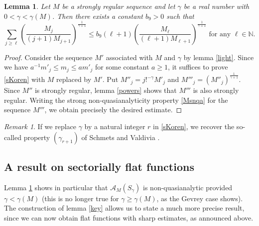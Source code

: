 \documentclass[a4paper]{amsart}
\theoremstyle{plain}
\newtheorem{lem}[subsubsection]{Lemma}
\theoremstyle{definition}
\theoremstyle{remark}
\newtheorem{rem}[subsubsection]{Remark}
\begin{document}
\begin{lem}\label{classqa}
Let $ M $ be a strongly regular sequence and let $ \gamma $ be a real number with
$ 0<\gamma<\gamma(M) $. Then there exists a constant $ b_9>0 $ such that 
\begin{equation}\label{sKoren}
\sum_{j\geq\ell}\left(\frac{M_j}{(j+1)M_{j+1}}\right)^{\frac{1}{\gamma+1}}\leq
b_9(\ell+1)\left(\frac{M_\ell}{(\ell+1)M_{\ell+1}}\right)^{\frac{1}{\gamma+1}}
\text{ for any }\ell\in\mathbb{N}.
\end{equation} 
\end{lem}
\begin{proof}
Consider the sequence $ M' $ associated with $ M $ and $ \gamma $ by lemma \ref{light}. Since we have $ a^{-1}m'_j\leq m_j\leq am'_j $ for some constant $ a\geq 1 $, it suffices to prove \eqref{sKoren} with $ M $ replaced by $ M' $. Put $ M''_j=j!^{-\gamma}M'_j $ and
$ M'''_j=(M''_j)^{\frac{1}{\gamma+1}} $. Since $ M'' $ is strongly regular, lemma \ref{powers} shows that $ M''' $ is also strongly regular. Writing the strong non-quasianalyticity property \eqref{Msnqa} for the sequence $ M''' $, we obtain precisely the desired estimate.
\end{proof}

\begin{rem} 
If we replace $ \gamma $ by a natural integer $ r $ in \eqref{sKoren}, we recover the so-called property $ (\gamma_{r+1}) $ of Schmets and Valdivia \cite{SV}.
\end{rem}

\subsection{A result on sectorially flat functions}\label{sharpsectflat}
Lemma \ref{classqa} shows in particular that
$ \mathcal{A}_M(S_\gamma) $ is non-quasianalytic provided $ \gamma<\gamma(M) $ (this is no longer true for $ \gamma\geq\gamma(M) $, as the Gevrey case shows). The construction of lemma \ref{key} allows us to state a much more precise result, since we can now obtain flat functions with sharp estimates, as announced above. 
\end{document}
